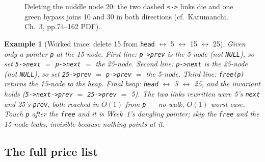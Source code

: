 \documentclass[11pt]{article}
\newtheorem{example}{Example}[section]
\begin{document}
\begin{figure}[h]
  \centering
  \caption{Deleting the middle node 20: the two dashed \texttt{<->} links die and one green bypass joins 10 and 30 in both directions (cf.\ Karumanchi, Ch.~3, pp.74--162 PDF).}
  \label{fig:dll-delete}
\end{figure}

\begin{example}[Worked trace: delete 15 from \texttt{head} $\leftrightarrow$ 5 $\leftrightarrow$ 15 $\leftrightarrow$ 25]
Given only a pointer \texttt{p} at the 15-node. First line: \texttt{p->prev} is the 5-node (not \texttt{NULL}), so set \texttt{5->next} $=$ \texttt{p->next} $=$ the 25-node. Second line: \texttt{p->next} is the 25-node (not \texttt{NULL}), so set \texttt{25->prev} $=$ \texttt{p->prev} $=$ the 5-node. Third line: \texttt{free(p)} returns the 15-node to the heap. Final heap: \texttt{head} $\leftrightarrow$ 5 $\leftrightarrow$ 25, and the invariant holds (\texttt{5->next->prev} $=$ \texttt{25->prev} $=$ 5). The two links rewritten were 5's \texttt{next} and 25's \texttt{prev}, both reached in $O(1)$ from \texttt{p} --- no walk, $O(1)$ worst case. Touch \texttt{p} after the \texttt{free} and it is Week~1's dangling pointer; skip the \texttt{free} and the 15-node leaks, invisible because nothing points at it.
\end{example}

\subsection{The full price list}
\end{document}
